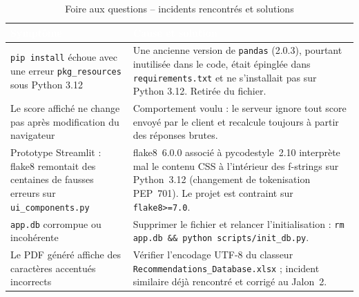 \documentclass[12pt, a4paper, oneside]{report}
\begin{document}
\renewcommand{\thetable}{D.1}
\begin{table}[H]
  \centering
  \caption{Foire aux questions -- incidents rencontrés et solutions}
  \label{tab:annexe_faq}
  \renewcommand{\arraystretch}{1.4}
  \small
  \begin{tabularx}{\textwidth}{|>{\raggedright\arraybackslash}X|>{\raggedright\arraybackslash}X|}
    \hline
    \rowcolor{iacsTableHead}
    \textcolor{white}{\textbf{Symptôme}} &
    \textcolor{white}{\textbf{Cause et solution}} \\
    \hline
    \texttt{pip install} échoue avec une erreur \texttt{pkg\_resources} sous Python 3.12 & Une ancienne version de \texttt{pandas} (2.0.3), pourtant inutilisée dans le code, était épinglée dans \texttt{requirements.txt} et ne s'installait pas sur Python 3.12. Retirée du fichier. \\
    \hline
    \rowcolor{iacsLightGray}
    Le score affiché ne change pas après modification du navigateur & Comportement voulu : le serveur ignore tout score envoyé par le client et recalcule toujours à partir des réponses brutes. \\
    \hline
    Prototype Streamlit : flake8 remontait des centaines de fausses erreurs sur \texttt{ui\_components.py} & flake8~6.0.0 associé à pycodestyle~2.10 interprète mal le contenu CSS à l'intérieur des f-strings sur Python~3.12 (changement de tokenisation PEP~701). Le projet est contraint sur \texttt{flake8>=7.0}. \\
    \hline
    \rowcolor{iacsLightGray}
    \texttt{app.db} corrompue ou incohérente & Supprimer le fichier et relancer l'initialisation : \texttt{rm app.db \&\& python scripts/init\_db.py}. \\
    \hline
    Le PDF généré affiche des caractères accentués incorrects & Vérifier l'encodage UTF-8 du classeur \texttt{Recommendations\_Database.xlsx} ; incident similaire déjà rencontré et corrigé au Jalon~2. \\
    \hline
  \end{tabularx}
\end{table}
\end{document}
